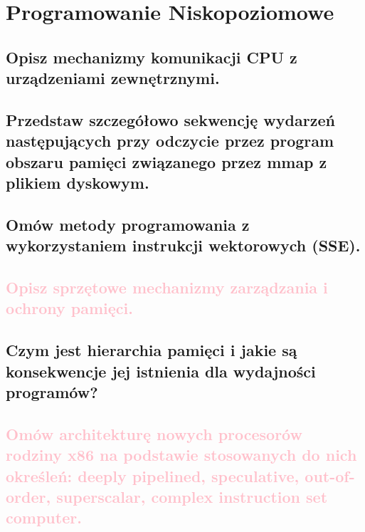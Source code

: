 \chapter{Programowanie Niskopoziomowe}

\section{Opisz mechanizmy komunikacji CPU z urządzeniami zewnętrznymi.}


\section{Przedstaw szczegółowo sekwencję wydarzeń następujących przy odczycie przez program obszaru pamięci związanego przez mmap z plikiem dyskowym.}



\section{Omów metody programowania z wykorzystaniem instrukcji wektorowych (SSE).}


\section{\textcolor{pink}{Opisz sprzętowe mechanizmy zarządzania i ochrony pamięci.}}


\section{Czym jest hierarchia pamięci i jakie są konsekwencje jej istnienia dla wydajności programów?}


\section{\textcolor{pink}{Omów architekturę nowych procesorów rodziny x86 na podstawie stosowanych do nich określeń: deeply pipelined, speculative, out-of-order, superscalar, complex instruction set computer.}}

